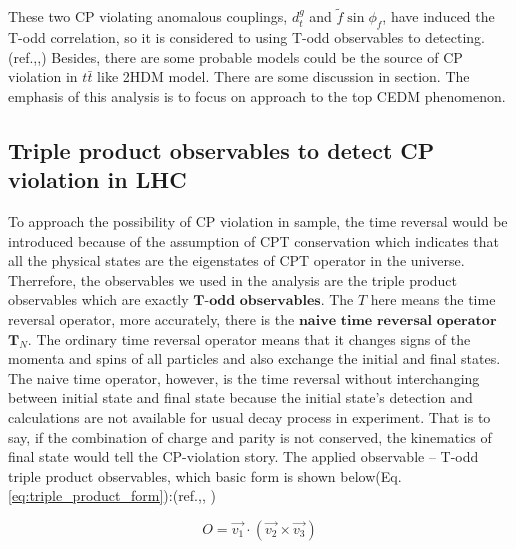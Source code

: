 		These two CP violating anomalous couplings, $d_t^g$ and $\widetilde{f} \sin{\phi_f}$, have induced the T-odd correlation, so it is considered to using T-odd observables to detecting.(ref.\cite{PhysRevD.81.034013},\cite{PhysRevD.79.013013},\cite{PhysRevD.80.034013}) Besides, there are some probable models could be the source of CP violation in $t\bar{t}$ like 2HDM model. There are some discussion in section. The emphasis of this analysis is to focus on approach to the top CEDM phenomenon.


	\subsection{Triple product observables to detect CP violation in LHC}
	\label{ssec:Intro_TPinLHC}


		To approach the possibility of CP violation in sample, the time reversal would be introduced because of the assumption of CPT conservation which indicates that all the physical states are the eigenstates of CPT operator in the universe. Therrefore, the observables we used in the analysis are the triple product observables which are exactly $\textbf{T-odd}$ $\textbf{observables}$. The $T$ here means the time reversal operator, more accurately, there is the $\textbf{naive}$ $\textbf{time}$ $\textbf{reversal}$ $\textbf{operator}$ $\textbf{T}_N$. The ordinary time reversal operator means that it changes signs of the momenta and spins of all particles and also exchange the initial and final states. The naive time operator, however, is the time reversal without interchanging between initial state and final state because the initial state's detection and calculations are not available for usual decay process in experiment. That is to say, if the combination of charge and parity is not conserved, the kinematics of final state would tell the CP-violation story. The applied observable -- T-odd triple product observables, which basic form is shown below(Eq.\ref{eq:triple_product_form}):(ref.\cite{PhysRevLett.58.451},\cite{PhysRevD.80.034013}, )

		\begin{equation}
		O = \vec{v_{1}} \cdot ( \vec{v_2} \times \vec{v_{3}} )
		\label{eq:triple_product_form}
		\end{equation}
		\FloatBarrier

